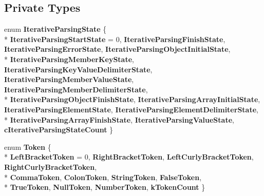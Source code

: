 \subsection*{Private Types}
\begin{DoxyCompactItemize}
\item 
enum {\bfseries Iterative\+Parsing\+State} \{ \\*
{\bfseries Iterative\+Parsing\+Start\+State} = 0, 
{\bfseries Iterative\+Parsing\+Finish\+State}, 
{\bfseries Iterative\+Parsing\+Error\+State}, 
{\bfseries Iterative\+Parsing\+Object\+Initial\+State}, 
\\*
{\bfseries Iterative\+Parsing\+Member\+Key\+State}, 
{\bfseries Iterative\+Parsing\+Key\+Value\+Delimiter\+State}, 
{\bfseries Iterative\+Parsing\+Member\+Value\+State}, 
{\bfseries Iterative\+Parsing\+Member\+Delimiter\+State}, 
\\*
{\bfseries Iterative\+Parsing\+Object\+Finish\+State}, 
{\bfseries Iterative\+Parsing\+Array\+Initial\+State}, 
{\bfseries Iterative\+Parsing\+Element\+State}, 
{\bfseries Iterative\+Parsing\+Element\+Delimiter\+State}, 
\\*
{\bfseries Iterative\+Parsing\+Array\+Finish\+State}, 
{\bfseries Iterative\+Parsing\+Value\+State}, 
{\bfseries c\+Iterative\+Parsing\+State\+Count}
 \}\hypertarget{class_generic_reader_a269700a68b925db2f3ecc84b75f2277e}{}\label{class_generic_reader_a269700a68b925db2f3ecc84b75f2277e}

\item 
enum {\bfseries Token} \{ \\*
{\bfseries Left\+Bracket\+Token} = 0, 
{\bfseries Right\+Bracket\+Token}, 
{\bfseries Left\+Curly\+Bracket\+Token}, 
{\bfseries Right\+Curly\+Bracket\+Token}, 
\\*
{\bfseries Comma\+Token}, 
{\bfseries Colon\+Token}, 
{\bfseries String\+Token}, 
{\bfseries False\+Token}, 
\\*
{\bfseries True\+Token}, 
{\bfseries Null\+Token}, 
{\bfseries Number\+Token}, 
{\bfseries k\+Token\+Count}
 \}\hypertarget{class_generic_reader_a78cbc3012843daeaa44cb3c2b779a8a8}{}\label{class_generic_reader_a78cbc3012843daeaa44cb3c2b779a8a8}

\end{DoxyCompactItemize}
